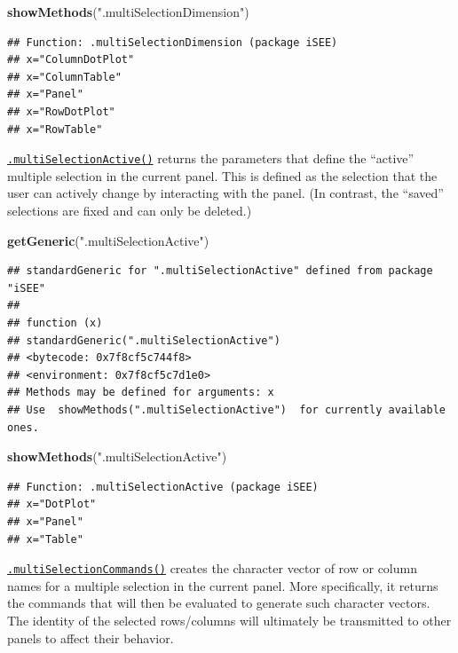 \documentclass[
]{book}
\newenvironment{Shaded}{\begin{snugshade}}{\end{snugshade}}
\newcommand{\KeywordTok}[1]{\textcolor[rgb]{0.13,0.29,0.53}{\textbf{#1}}}
\newcommand{\NormalTok}[1]{#1}
\newcommand{\StringTok}[1]{\textcolor[rgb]{0.31,0.60,0.02}{#1}}
\begin{document}
\begin{Shaded}
\begin{Highlighting}[]
\KeywordTok{showMethods}\NormalTok{(}\StringTok{".multiSelectionDimension"}\NormalTok{)}
\end{Highlighting}
\end{Shaded}

\begin{verbatim}
## Function: .multiSelectionDimension (package iSEE)
## x="ColumnDotPlot"
## x="ColumnTable"
## x="Panel"
## x="RowDotPlot"
## x="RowTable"
\end{verbatim}

\href{https://isee.github.io/iSEE/reference/multi-select-generics.html}{\texttt{.multiSelectionActive()}} returns the parameters that define the ``active'' multiple selection in the current panel.
This is defined as the selection that the user can actively change by interacting with the panel.
(In contrast, the ``saved'' selections are fixed and can only be deleted.)

\begin{Shaded}
\begin{Highlighting}[]
\KeywordTok{getGeneric}\NormalTok{(}\StringTok{".multiSelectionActive"}\NormalTok{)}
\end{Highlighting}
\end{Shaded}

\begin{verbatim}
## standardGeneric for ".multiSelectionActive" defined from package "iSEE"
## 
## function (x) 
## standardGeneric(".multiSelectionActive")
## <bytecode: 0x7f8cf5c744f8>
## <environment: 0x7f8cf5c7d1e0>
## Methods may be defined for arguments: x
## Use  showMethods(".multiSelectionActive")  for currently available ones.
\end{verbatim}

\begin{Shaded}
\begin{Highlighting}[]
\KeywordTok{showMethods}\NormalTok{(}\StringTok{".multiSelectionActive"}\NormalTok{)}
\end{Highlighting}
\end{Shaded}

\begin{verbatim}
## Function: .multiSelectionActive (package iSEE)
## x="DotPlot"
## x="Panel"
## x="Table"
\end{verbatim}

\href{https://isee.github.io/iSEE/reference/multi-select-generics.html}{\texttt{.multiSelectionCommands()}} creates the character vector of row or column names for a multiple selection in the current panel.
More specifically, it returns the commands that will then be evaluated to generate such character vectors.
The identity of the selected rows/columns will ultimately be transmitted to other panels to affect their behavior.
\end{document}
